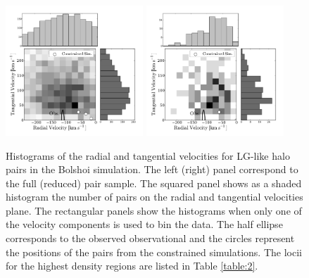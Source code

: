 \documentclass{emulateapj}
\begin{document}
\begin{figure}
\begin{center}
\includegraphics[keepaspectratio=true,width=0.46\textwidth]{./figures/test_rt_BDM.pdf}
\includegraphics[keepaspectratio=true,width=0.46\textwidth]{./figures/test_rt_BDM_narrow.pdf}
\caption{Histograms of the radial and tangential velocities for
  LG-like halo pairs in the Bolshoi simulation. The left (right) panel
  correspond to the full (reduced) pair sample.
The squared panel shows as a shaded histogram the number of pairs on
the radial and tangential velocities plane. The rectangular panels show the
  histograms when only one of the velocity components is used to bin
  the data. The half ellipse corresponds to the observed observational
  and the circles represent the positions of the
  pairs from the constrained simulations. The locii for the highest
  density regions are listed in Table \ref{table:2}.} 
\label{fig:rt}
\end{center}

\end{figure}
\end{document}
